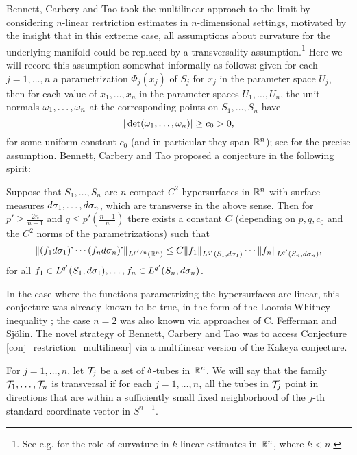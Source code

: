 \documentclass[brochure,english,12pt]{bourbaki}%
\begin{document}
Bennett, Carbery and Tao \cite{BCT06} took the multilinear approach to the limit by considering $n$-linear restriction estimates in $n$-dimensional settings, motivated by the insight that in this extreme case, all assumptions about curvature for the underlying manifold could be replaced by a transversality assumption.\footnote{See e.g. \cite{Bej16x} for the role of curvature in $k$-linear estimates in $\mathbb{R}^n$, where $k < n$.} Here we will record this assumption 
somewhat informally as follows: given for each $j=1,\ldots, n$ a parametrization $\Phi_j(x_j)$ of $S_j$ for $x_j$ in the parameter space $U_j$, then for each value of $x_1,\ldots, x_n$ in the parameter spaces $U_1,\ldots, U_n$, the unit normals $\omega_1,\ldots, \omega_n$ at the corresponding points on $S_1,\ldots, S_n$ have 
\[ |\det (\omega_1,\ldots, \omega_n)| \geq c_0>0,\]
for some uniform constant $c_0$ (and in particular they span $\mathbb{R}^n$); see \cite[Conj. 1.3]{BCT06} for the precise assumption. Bennett, Carbery and Tao proposed a conjecture in the following spirit:
\begin{conj}\label{conj_restriction_multilinear}
Suppose that $S_1,\ldots, S_n$ are $n$ compact $C^2$ hypersurfaces in $\mathbb{R}^n$ with surface measures $d\sigma_1,\ldots, d\sigma_n$, which are transverse in the above sense.
Then for $p' \geq \frac{2n}{n-1}$ and $q \leq p'(\frac{n-1}{n})$ there exists a constant $C$ (depending on $p,q,c_0$ and the $C^2$ norms of the parametrizations) such that 
\[ \| (f_1 d \sigma_1)\check{\;} \cdots (f_n d\sigma_n)\check{\;} \|_{L^{p'/n}(\mathbb{R}^n)} \leq C \| f_1 \|_{L^{q'}(S_1,d\sigma_1)} \cdots \| f_n \|_{L^{q'}(S_n,d\sigma_n)}, \]
for all $f_1 \in L^{q'}(S_1,d\sigma_1), \ldots, f_n \in L^{q'}(S_n,d\sigma_n)$.
\end{conj}
In the case where the functions parametrizing the hypersurfaces are linear, this conjecture was already known to be true, in the form of the Loomis-Whitney inequality \cite{LooWhi49}; the case $n=2$ was also known via approaches of C. Fefferman and Sj\"{o}lin.
The novel strategy of Bennett, Carbery and Tao was to access Conjecture \ref{conj_restriction_multilinear} via a multilinear version of the Kakeya conjecture. 

For $j=1,\ldots, n$, let $\mathcal{T}_j$ be a set of $\delta$-tubes in $\mathbb{R}^n$. We will say that the family $\mathcal{T}_1,\ldots, \mathcal{T}_n$ is transversal if for each $j=1,\ldots, n$, all the tubes in $\mathcal{T}_j$ point in directions that are within a sufficiently small fixed neighborhood of the $j$-th standard coordinate vector in $S^{n-1}$.
\end{document}
